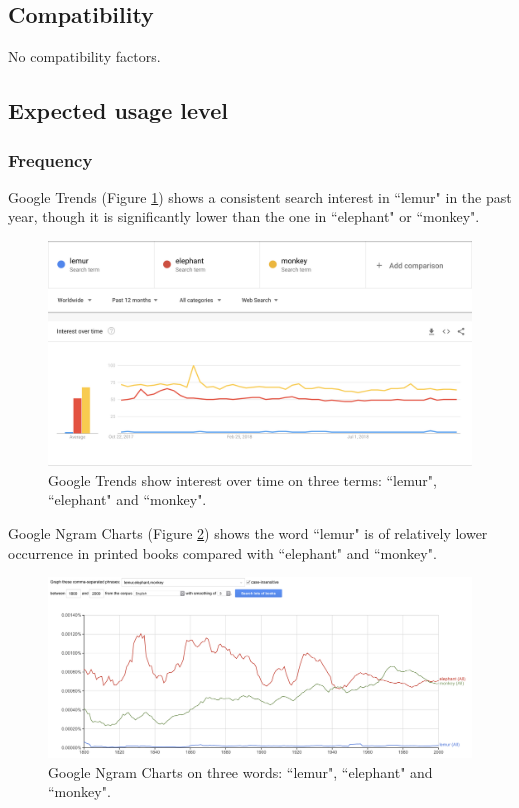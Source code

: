 \documentclass{article}
\begin{document}
\subsection{Compatibility}
No compatibility factors.

\subsection{Expected usage level}
\subsubsection{Frequency}

Google Trends (Figure \ref{fig:google-trend}) shows a consistent search interest in ``lemur" in the past year, though it is significantly lower than the one in ``elephant" or ``monkey".

\begin{figure}[h]
  \includegraphics[width=\linewidth]{img/google-trend.png}
  \caption{Google Trends show interest over time on three terms: ``lemur", ``elephant" and ``monkey".}
  \label{fig:google-trend}
\end{figure}

Google Ngram Charts (Figure \ref{fig:google-ngram}) shows the word ``lemur" is of relatively lower occurrence in printed books compared with ``elephant" and ``monkey".

\begin{figure}[h]
  \includegraphics[width=\linewidth]{img/google-ngram.png}
  \caption{Google Ngram Charts on three words: ``lemur", ``elephant" and ``monkey".}
  \label{fig:google-ngram}
\end{figure}
\end{document}
